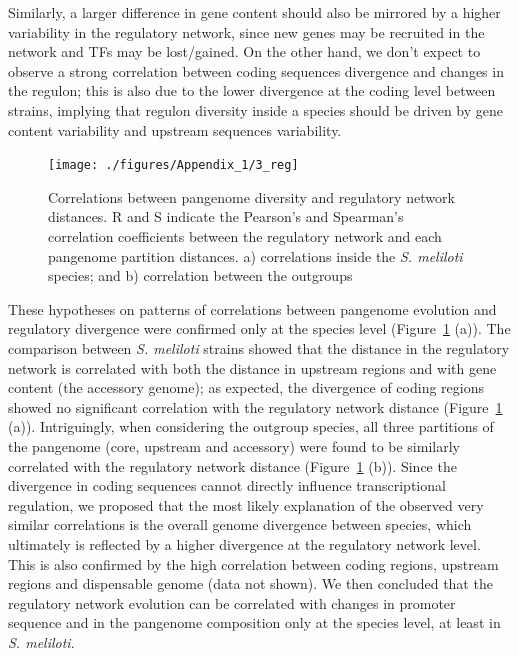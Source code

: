 Similarly, a larger difference in gene content should also be mirrored by a higher variability in the regulatory network, since new genes may be recruited in the network and TFs may be lost/gained.
 On the other hand, we don't expect to observe a strong correlation between coding sequences divergence and changes in the regulon; this is also due to the lower divergence at the coding level between strains, implying that regulon diversity inside a species should be driven by gene content variability and upstream sequences variability. %
\begin{figure}[!tb]
	\centering
	\texttt{[image: ./figures/Appendix\_1/3\_reg]}
  	\caption{\label{fig:reg3} Correlations between pangenome diversity and regulatory network distances. R and S indicate the Pearson's and Spearman's correlation coefficients between the regulatory network and each pangenome partition distances. a) correlations inside the \textit{S. meliloti} species; and b) correlation between the outgroups}
\end{figure}%
These hypotheses on patterns of correlations between pangenome evolution and regulatory divergence were confirmed only at the species level (Figure~\ref{fig:reg3} (a)).
The comparison between \textit{S. meliloti} strains showed that the distance in the regulatory network is correlated with both the distance in upstream regions and with gene content (the accessory genome); as expected, the divergence of coding regions showed no significant correlation with the regulatory network distance (Figure~\ref{fig:reg3} (a)). 
Intriguingly, when considering the outgroup species, all three partitions of the pangenome (core, upstream and accessory) were found to be similarly correlated with the regulatory network distance (Figure~\ref{fig:reg3} (b)).
Since the divergence in coding sequences cannot directly influence transcriptional regulation, we proposed that the most likely explanation of the observed very similar correlations is the overall genome divergence between species, which ultimately is reflected by a higher divergence at the regulatory network level.
This is also confirmed by the high correlation between coding regions, upstream regions and dispensable genome (data not shown).
We then concluded that the regulatory network evolution can be correlated with changes in promoter sequence and in the pangenome composition only at the species level, at least in \textit{S. meliloti}.

